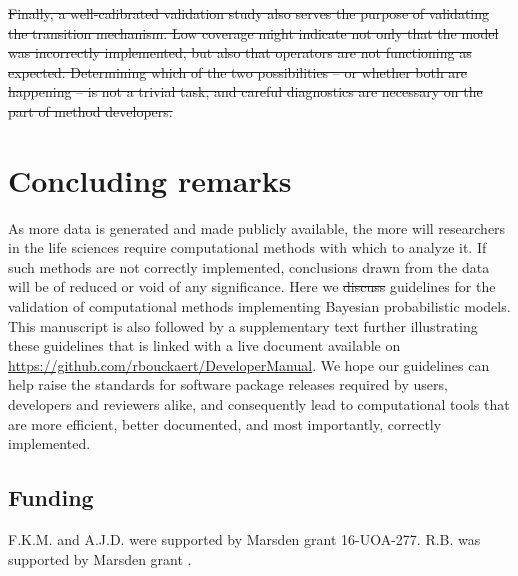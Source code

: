 \documentclass[oneside]{article}
\providecommand{\DIFaddtex}[1]{{\protect\color{blue}\uwave{#1}}} %
\providecommand{\DIFdeltex}[1]{{\protect\color{red}\sout{#1}}}                      %
\providecommand{\DIFaddbegin}{} %
\providecommand{\DIFaddend}{} %
\providecommand{\DIFdelbegin}{} %
\providecommand{\DIFdelend}{} %
\providecommand{\DIFadd}[1]{\texorpdfstring{\DIFaddtex{#1}}{#1}} %
\providecommand{\DIFdel}[1]{\texorpdfstring{\DIFdeltex{#1}}{}} %
\newcommand{\DIFscaledelfig}{0.5}
\newlength{\DIFdelgraphicswidth} %
\newlength{\DIFdelgraphicsheight} %
\newcommand{\DIFaddincludegraphics}[2][]{{\color{blue}\fbox{\DIFOincludegraphics[#1]{#2}}}} %
\newcommand{\DIFdelincludegraphics}[2][]{%
\sbox{\DIFdelgraphicsbox}{\DIFOincludegraphics[#1]{#2}}%
\settoboxwidth{\DIFdelgraphicswidth}{\DIFdelgraphicsbox} %
\settoboxtotalheight{\DIFdelgraphicsheight}{\DIFdelgraphicsbox} %
\scalebox{\DIFscaledelfig}{%
\parbox[b]{\DIFdelgraphicswidth}{\usebox{\DIFdelgraphicsbox}\\[-\baselineskip] \rule{\DIFdelgraphicswidth}{0em}}\llap{\resizebox{\DIFdelgraphicswidth}{\DIFdelgraphicsheight}{%
\setlength{\unitlength}{\DIFdelgraphicswidth}%
\begin{picture}(1,1)%
\thicklines\linethickness{2pt} %
{\color[rgb]{1,0,0}\put(0,0){\framebox(1,1){}}}%
{\color[rgb]{1,0,0}\put(0,0){\line( 1,1){1}}}%
{\color[rgb]{1,0,0}\put(0,1){\line(1,-1){1}}}%
\end{picture}%
}\hspace*{3pt}}} %
} %
\DeclareRobustCommand{\DIFaddbegin}{\DIFOaddbegin \let\includegraphics\DIFaddincludegraphics} %
\DeclareRobustCommand{\DIFaddend}{\DIFOaddend \let\includegraphics\DIFOincludegraphics} %
\DeclareRobustCommand{\DIFdelbegin}{\DIFOdelbegin \let\includegraphics\DIFdelincludegraphics} %
\DeclareRobustCommand{\DIFdelend}{\DIFOaddend \let\includegraphics\DIFOincludegraphics} %
\begin{document}
\DIFdelbegin \DIFdel{Finally, a well-calibrated validation study also serves the purpose of
validating the transition mechanism.
Low coverage might indicate not only that the model was incorrectly
implemented, but also that operators are not functioning as expected.
Determining which of the two possibilities -- or whether both are
happening -- is not a trivial task, and careful diagnostics are
necessary on the part of method developers.
}\DIFdelend %

\section*{Concluding remarks}

As more data is generated and made publicly available, the more will
researchers in the life sciences require computational methods with
which to analyze it.
If such methods are not correctly implemented, conclusions drawn from
the data will be of reduced or void of any significance.
Here we \DIFdelbegin \DIFdel{discuss }\DIFdelend \DIFaddbegin \DIFadd{discussed }\DIFaddend guidelines for the validation of computational methods
implementing Bayesian probabilistic models.
This manuscript is also followed by a supplementary text further
illustrating these guidelines that is linked with a live document
available on \href{https://github.com/rbouckaert/DeveloperManual}{https://github.com/rbouckaert/DeveloperManual}.
We hope our guidelines can help raise the standards for software
package releases required by users, developers and reviewers alike,
and consequently lead to computational tools that are more efficient,
better documented, and most importantly, correctly implemented.

\subsection*{Funding}
F.K.M. and A.J.D. were supported by Marsden grant 16-UOA-277. R.B. was
supported by Marsden grant .






\DIFaddbegin 

\DIFaddend 
\end{document}
